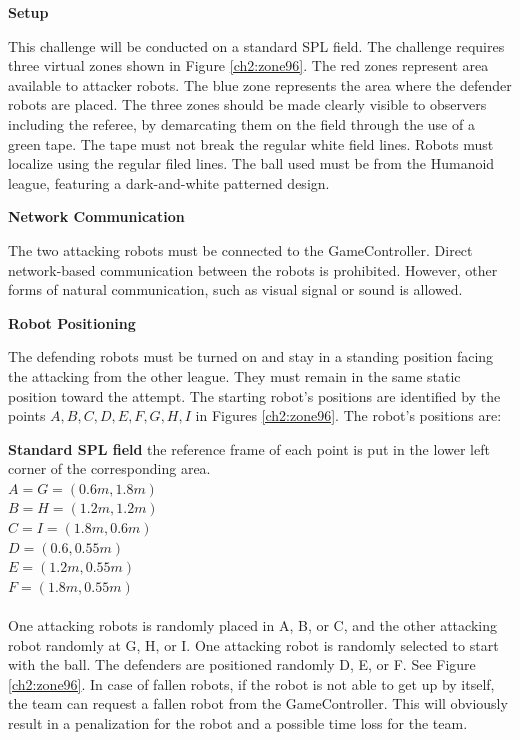 {\bigskip
{\bfseries Setup}
\smallskip

This challenge will be conducted on a standard SPL field.
The challenge requires three virtual zones shown in Figure \ref{ch2:zone96}.
The red zones represent area available to attacker robots. The blue zone represents the area where the defender robots are placed.
The three zones should be made clearly visible to observers including the referee, by demarcating them on the field through the use of a green tape. The tape must not break the regular white field lines.
Robots must localize using the regular filed lines.
The ball used must be from the Humanoid league, featuring a dark-and-white patterned design.

\bigskip
{\bfseries Network Communication}
\smallskip

The two attacking robots must be connected to the GameController.
Direct network-based communication between the robots is prohibited.
However, other forms of natural communication, such as visual signal or sound is allowed.

\bigskip
{\bfseries Robot Positioning}
\smallskip

The defending robots must be turned on and stay in a standing position facing the attacking from the other league.
They must remain in the same static position toward the attempt.
The starting robot's positions are identified by the points ${A,B,C,D,E,F,G,H,I}$ in Figures \ref{ch2:zone96}.
The robot's positions are:

\textbf{Standard SPL field} the reference frame of each point is put in the lower left corner of the corresponding area.
\\
$A = G = (0.6m, 1.8m)$
\\
$B = H = (1.2m, 1.2m)$
\\
$C = I = (1.8m, 0.6m)$
\\
$D = (0.6, 0.55m)$
\\
$E = (1.2m, 0.55m)$
\\
$F = (1.8m, 0.55m)$
\\
\\

One attacking robots is randomly placed in A, B, or C, and the other attacking robot randomly at G, H, or I.
One attacking robot is randomly selected to start with the ball.
The defenders are positioned randomly D, E, or F.
See Figure \ref{ch2:zone96}.
In case of fallen robots, if the robot is not able to get up by itself, the team can request a fallen robot from the GameController.
This will obviously result in a penalization for the robot and a possible time loss for the team.

}
